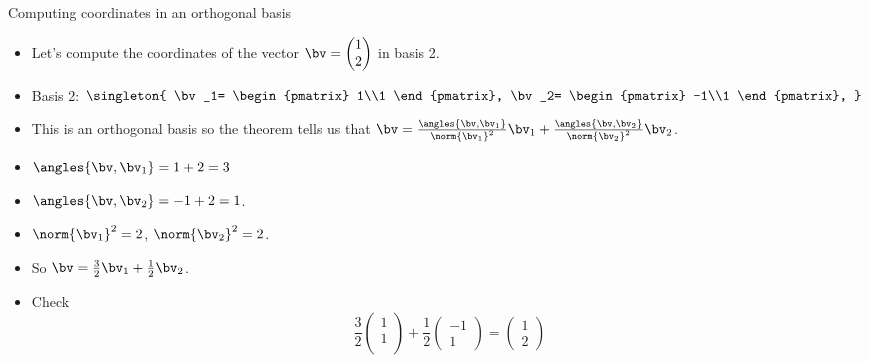 \documentclass{beamer}
\begin{document}
\begin{frame}{Computing coordinates in an orthogonal basis}
\begin{itemize}
\item Let's compute the coordinates of the vector $\bv=\begin{pmatrix} 1\\2 \end{pmatrix}$ in basis 2.
\item Basis 2: $\singleton{
\bv_1=
\begin{pmatrix} 1\\1 \end{pmatrix},
\bv_2=
\begin{pmatrix} -1\\1 \end{pmatrix},
}$
\item This is an orthogonal basis so the theorem tells us that $\bv=\frac{\angles{\bv,\bv_1}}{\norm{\bv_1}^2}\bv_1 + \frac{\angles{\bv,\bv_2}}{\norm{\bv_2}^2}\bv_2$.
\item $\angles{\bv,\bv_1} = 1 + 2 = 3$
\item $\angles{\bv,\bv_2} = -1 + 2 = 1$.
\item $\norm{\bv_1}^2=2$, $\norm{\bv_2}^2=2$.
\item So $\bv=\frac{3}{2}\bv_1 + \frac{1}{2}\bv_2$.
\item Check
$$
\frac{3}{2}
\begin{pmatrix}1\\1\\\end{pmatrix} +  \frac{1}{2}\begin{pmatrix}-1\\1\end{pmatrix}
=\begin{pmatrix}1\\2\end{pmatrix}
$$
\end{itemize}
\end{frame}
\end{document}
